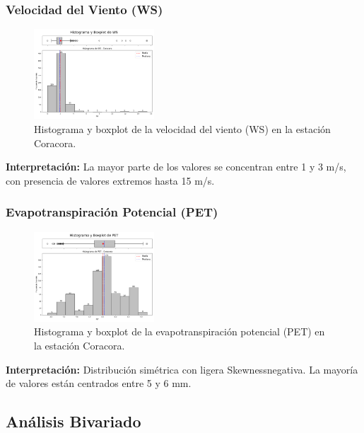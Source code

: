 \subsubsection*{Velocidad del Viento (WS)}
\begin{figure}[H]
\centering
\includegraphics[width=0.4\textwidth]{resultados/por_estacion_meteorologica/Coracora/WS_histograma.png}
\caption{Histograma y boxplot de la velocidad del viento (WS) en la estación Coracora.}
\label{fig:coracora_WS}
\end{figure}
\textbf{Interpretación:} La mayor parte de los valores se concentran entre 1 y 3 m/s, con presencia de valores extremos hasta 15 m/s.

\subsubsection*{Evapotranspiración Potencial (PET)}
\begin{figure}[H]
\centering
\includegraphics[width=0.4\textwidth]{resultados/por_estacion_meteorologica/Coracora/PET_histograma.png}
\caption{Histograma y boxplot de la evapotranspiración potencial (PET) en la estación Coracora.}
\label{fig:coracora_PET}
\end{figure}
\textbf{Interpretación:} Distribución simétrica con ligera Skewnessnegativa. La mayoría de valores están centrados entre 5 y 6 mm.

\subsection{Análisis Bivariado}

